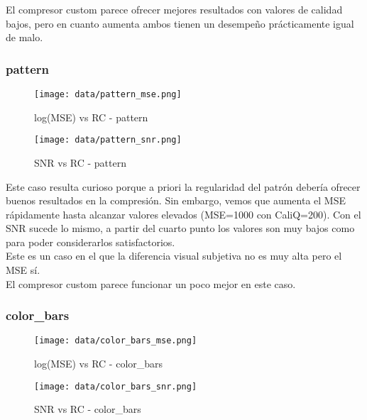\documentclass[12pt,a4paper]{article}
\begin{document}
El compresor custom parece ofrecer mejores resultados con valores de calidad bajos, pero en cuanto aumenta ambos tienen un desempeño prácticamente igual de malo.

\subsubsection{pattern}
\hspace*{-2.5em}
\begin{minipage}{0.5\textwidth}
        \centering
        \begin{figure}[H]
    \centering
    \texttt{[image: data/pattern\_mse.png]}
    \caption{log(MSE) vs RC - pattern}
    
\end{figure}
\end{minipage}\hfill
    \begin{minipage}{0.5\textwidth}
        \centering
        \begin{figure}[H]
    \centering
    \texttt{[image: data/pattern\_snr.png]}
    \caption{SNR vs RC - pattern}
    
\end{figure}
\end{minipage}
\vspace{2em}

Este caso resulta curioso porque a priori la regularidad del patrón debería ofrecer buenos resultados en la compresión. Sin embargo, vemos que aumenta el MSE rápidamente hasta alcanzar valores elevados (MSE=1000 con CaliQ=200). Con el SNR sucede lo mismo, a partir del cuarto punto los valores son muy bajos como para poder considerarlos satisfactorios.\\

Este es un caso en el que la diferencia visual subjetiva no es muy alta pero el MSE sí.\\

El compresor custom parece funcionar un poco mejor en este caso.\\


\subsubsection{color\_bars}
\hspace*{-2.5em}
\begin{minipage}{0.5\textwidth}
        \centering
        \begin{figure}[H]
    \centering
    \texttt{[image: data/color\_bars\_mse.png]}
    \caption{log(MSE) vs RC - color\_bars}
    
\end{figure}
\end{minipage}\hfill
    \begin{minipage}{0.5\textwidth}
        \centering
        \begin{figure}[H]
    \centering
    \texttt{[image: data/color\_bars\_snr.png]}
    \caption{SNR vs RC - color\_bars}
    
\end{figure}
\end{minipage}
\vspace{2em}
\end{document}
